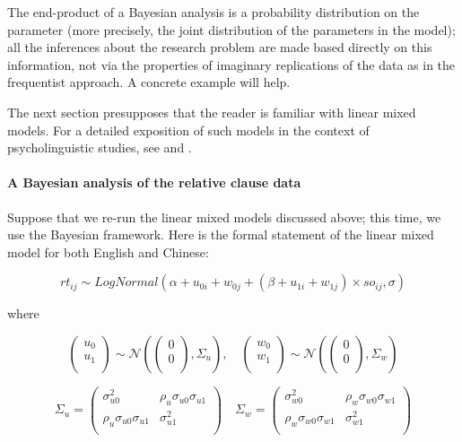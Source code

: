 \documentclass{ar-1col}\usepackage[]{graphicx}\usepackage[]{color}
\begin{document}
The end-product of a Bayesian analysis is a probability distribution on the parameter (more precisely, the joint distribution of the parameters in the model); all the inferences about the research problem are made based directly on this information, not via the properties of imaginary replications of the data as in the frequentist approach. A concrete example will help.

The next section presupposes that the reader is familiar with linear mixed models. For a detailed exposition of such models in the context of psycholinguistic studies, see \citet{VasishthEtAlFreq2019} and \citet{NicenboimEtAlBayes2019}.


\paragraph{A Bayesian analysis of the relative clause data}
Suppose that we re-run the linear mixed models discussed above; this time, we use the Bayesian framework. Here is the formal statement of the linear mixed model for both English and Chinese:

\begin{equation*} \label{eq:mainmodel}
rt_{ij} \sim \mathit{LogNormal}(\alpha + u_{0i} + w_{0j} + (\beta + u_{1i} + w_{1j}) \times so_{ij}, \sigma)
\end{equation*}

\noindent
where

\begin{equation*}\label{eq:jointpriordistLM}
\begin{pmatrix}
  u_0 \\
  u_1 \\
\end{pmatrix}
\sim
\mathcal{N} \left(
\begin{pmatrix}
  0 \\
  0 \\
\end{pmatrix},
\Sigma_{u}
\right),
\quad
\begin{pmatrix}
  w_0 \\
  w_1 \\
\end{pmatrix}
\sim
\mathcal{N}\left(
\begin{pmatrix}
  0 \\
  0 \\
\end{pmatrix},
\Sigma_{w}
\right)
\end{equation*}


\begin{equation*}\label{eq:covmatLM}
\Sigma_u
=
\begin{pmatrix}
\sigma _{u0}^2  & \rho _{u}\sigma _{u0}\sigma _{u1}\\
\rho _{u}\sigma _{u0}\sigma _{u1}    & \sigma _{u1}^2\\
\end{pmatrix}
\quad
\Sigma _w
=
\begin{pmatrix}
\sigma _{w0}^2  & \rho _{w}\sigma _{w0}\sigma _{w1}\\
\rho _{w}\sigma _{w0}\sigma _{w1}    & \sigma _{w1}^2\\
\end{pmatrix}
\end{equation*}
\end{document}
